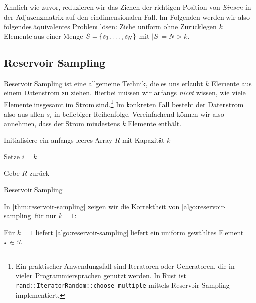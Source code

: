 Ähnlich wie zuvor, reduzieren wir das Ziehen der richtigen Position von \emph{Einsen} in der Adjazenzmatrix auf den eindimensionalen Fall.
Im Folgenden werden wir also folgendes äquivalentes Problem lösen:
Ziehe uniform ohne Zurücklegen $k$ Elemente aus einer Menge $S = \left\{s_1, \ldots, s_N\right\}$ mit $|S| = N > k$.

\subsection{Reservoir Sampling}
Reservoir Sampling ist eine allgemeine Technik, die es uns erlaubt $k$ Elemente aus einem Datenstrom zu ziehen.
Hierbei müssen wir anfangs \emph{nicht} wissen, wie viele Elemente insgesamt im Strom sind.\footnote{
    Ein praktischer Anwendungsfall sind \zB Iteratoren oder Generatoren, die in vielen Programmiersprachen genutzt werden.
    In Rust ist \zB \texttt{rand::IteratorRandom::choose\_multiple} mittels Reservoir Sampling implementiert.
}
Im konkreten Fall besteht der Datenstrom also aus allen $s_i$ in beliebiger Reihenfolge.
Vereinfachend können wir also annehmen, dass der Strom mindestens $k$ Elemente enthält.

\begin{algorithm}[H]

    Initialisiere ein anfangs leeres Array $R$ mit Kapazität $k$\;


    Setze $i = k$\;

    Gebe $R$ zurück

    \caption{Reservoir Sampling}
    \label{algo:reservoir-sampling}
\end{algorithm}

\bigskip
\bigskip

\noindent
In \cref{thm:reservoir-sampling} zeigen wir die Korrektheit von \cref{algo:reservoir-sampling} für nur $k = 1$:
\begin{theorem}\label{thm:reservoir-sampling}
    Für $k=1$ liefert \cref{algo:reservoir-sampling} liefert ein uniform gewähltes Element $x\in S$.
\end{theorem}

